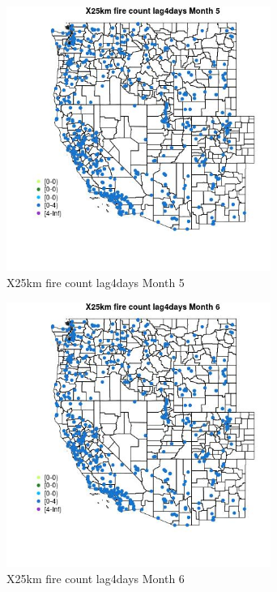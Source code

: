 \begin{figure} 
\centering  
\includegraphics[width=0.77\textwidth]{Code_Outputs/Report_ML_input_PM25_Step4_part_e_de_duplicated_aves_compiled_2019-05-14wNAs_MapObsMo5X25km_fire_count_lag4days.jpg} 
\caption{\label{fig:Report_ML_input_PM25_Step4_part_e_de_duplicated_aves_compiled_2019-05-14wNAsMapObsMo5X25km_fire_count_lag4days}X25km fire count lag4days Month 5} 
\end{figure} 
 

\begin{figure} 
\centering  
\includegraphics[width=0.77\textwidth]{Code_Outputs/Report_ML_input_PM25_Step4_part_e_de_duplicated_aves_compiled_2019-05-14wNAs_MapObsMo6X25km_fire_count_lag4days.jpg} 
\caption{\label{fig:Report_ML_input_PM25_Step4_part_e_de_duplicated_aves_compiled_2019-05-14wNAsMapObsMo6X25km_fire_count_lag4days}X25km fire count lag4days Month 6} 
\end{figure} 
 

